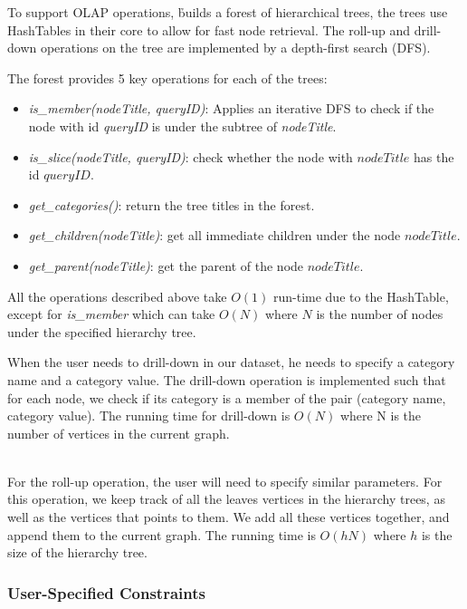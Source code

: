 To support OLAP operations,
\h builds a forest of hierarchical trees, the trees use HashTables in their core to
allow for fast node retrieval. The roll-up and drill-down operations
on the tree are implemented by a depth-first search (DFS).

The forest provides 5 key operations for each of the trees:
\begin{itemize}
    \item \textit{is\_member(nodeTitle, queryID)}: Applies an iterative DFS to check if
    the node with id \textit{queryID} is under the subtree of \textit{nodeTitle}.
    \item \textit{is\_slice(nodeTitle, queryID)}: check whether the node with $nodeTitle$
    has the id $queryID$.
    \item \textit{get\_categories()}: return the tree titles in the forest.
    \item \textit{get\_children(nodeTitle)}: get all immediate children under the node
    $nodeTitle$.
    \item \textit{get\_parent(nodeTitle)}: get the parent of the node $nodeTitle$.
\end{itemize}

All the operations described above take $O(1)$ run-time due to the HashTable, except for
\textit{is\_member} which can take $O(N)$ where $N$ is the number of nodes under the specified
hierarchy tree.

When the user needs to drill-down in our dataset, he needs to specify a category name and a category
value. The drill-down operation is implemented such that for each node, we check if its category is a member
of the pair (category name, category value). The running time for drill-down is $O(N)$ where N is the number of
vertices in the current graph.

\ \\

For the roll-up operation, the user will need to specify similar parameters.
For this operation, we keep track of all the leaves vertices in the hierarchy trees, as well as the vertices
that points to them. We add all these vertices together, and append them to the current graph.
The running time is $O(hN)$ where $h$ is the size of the hierarchy tree.


\subsubsection{User-Specified Constraints}
\label{sec:user_constraint}

